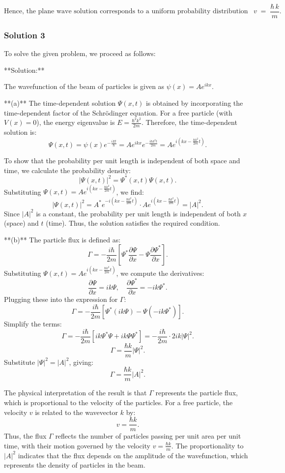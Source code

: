 \documentclass{article}
\begin{document}
\[
\boxed{
\text{Hence, the plane wave solution corresponds to a uniform probability distribution travelling with velocity } \;
v \;=\;\frac{\hbar\,k}{m}.
}
\]

\subsubsection{Solution 3}
To solve the given problem, we proceed as follows:

**Solution:**

The wavefunction of the beam of particles is given as $\psi(x) = A e^{ikx}$. 

**(a)** The time-dependent solution $\Psi(x, t)$ is obtained by incorporating the time-dependent factor of the Schrödinger equation. For a free particle (with $V(x) = 0$), the energy eigenvalue is $E = \frac{\hbar^2 k^2}{2m}$. Therefore, the time-dependent solution is:
\[
\Psi(x, t) = \psi(x)e^{-\frac{i E t}{\hbar}} = A e^{ikx} e^{-\frac{i \hbar k^2 t}{2m}} = A e^{i(kx - \frac{\hbar k^2}{2m}t)}.
\]

To show that the probability per unit length is independent of both space and time, we calculate the probability density:
\[
|\Psi(x, t)|^2 = \Psi^*(x, t) \Psi(x, t).
\]
Substituting $\Psi(x, t) = A e^{i(kx - \frac{\hbar k^2}{2m}t)}$, we find:
\[
|\Psi(x, t)|^2 = A^* e^{-i(kx - \frac{\hbar k^2}{2m}t)} \cdot A e^{i(kx - \frac{\hbar k^2}{2m}t)} = |A|^2.
\]
Since $|A|^2$ is a constant, the probability per unit length is independent of both $x$ (space) and $t$ (time). Thus, the solution satisfies the required condition.

**(b)** The particle flux is defined as:
\[
\Gamma = -\frac{i \hbar}{2m} \left[ \Psi^* \frac{\partial \Psi}{\partial x} - \Psi \frac{\partial \Psi^*}{\partial x} \right].
\]
Substituting $\Psi(x, t) = A e^{i(kx - \frac{\hbar k^2}{2m}t)}$, we compute the derivatives:
\[
\frac{\partial \Psi}{\partial x} = ik \Psi, \quad \frac{\partial \Psi^*}{\partial x} = -ik \Psi^*.
\]
Plugging these into the expression for $\Gamma$:
\[
\Gamma = -\frac{i \hbar}{2m} \left[ \Psi^* (ik \Psi) - \Psi (-ik \Psi^*) \right].
\]
Simplify the terms:
\[
\Gamma = -\frac{i \hbar}{2m} \left[ i k \Psi^* \Psi + i k \Psi \Psi^* \right] = -\frac{i \hbar}{2m} \cdot 2ik |\Psi|^2.
\]
\[
\Gamma = \frac{\hbar k}{m} |\Psi|^2.
\]
Substitute $|\Psi|^2 = |A|^2$, giving:
\[
\Gamma = \frac{\hbar k}{m} |A|^2.
\]

The physical interpretation of the result is that $\Gamma$ represents the particle flux, which is proportional to the velocity of the particles. For a free particle, the velocity $v$ is related to the wavevector $k$ by:
\[
v = \frac{\hbar k}{m}.
\]
Thus, the flux $\Gamma$ reflects the number of particles passing per unit area per unit time, with their motion governed by the velocity $v = \frac{\hbar k}{m}$. The proportionality to $|A|^2$ indicates that the flux depends on the amplitude of the wavefunction, which represents the density of particles in the beam.
\end{document}
